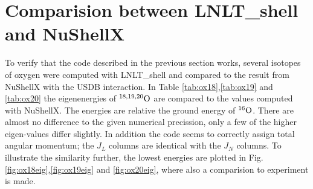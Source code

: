 \section{Comparision between LNLT\_shell and NuShellX}

To verify that the code described in the previous section works, several isotopes of oxygen were computed with LNLT\_shell and compared to the result from NuShellX with the USDB interaction. In Table \ref{tab:ox18},\ref{tab:ox19} and \ref{tab:ox20} the eigenenergies of \(^{18,19,20}\rm{O}\) are compared to the values computed with NuShellX. The energies are relative the ground energy of \(^{16}\rm{O}\). There are almost no difference to the given numerical precission, only a few of the higher eigen-values differ slightly. In addition the code seems to correctly assign total angular momentum; the \(J_L\) columns are identical with the \(J_N\) columns. To illustrate the similarity further, the lowest energies are plotted in Fig. \ref{fig:ox18eig},\ref{fig:ox19eig} and \ref{fig:ox20eig}, where also a comparision to experiment is made.

\onecolumngrid

